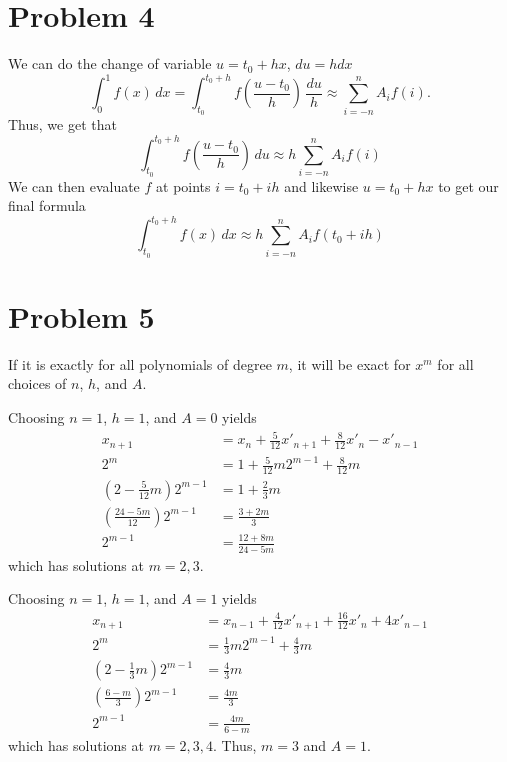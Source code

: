 \documentclass{article}
\begin{document}
\section*{Problem 4}
We can do the change of variable $u = t_0+hx$, $du = h dx$
\[
	\int_0^1 f(x) \,dx =
	\int_{t_0}^{t_0+h} f\left(\frac{u-t_0}{h}\right) \,\frac{du}{h}
	\approx \sum_{i=-n}^n A_i f(i).
\]
Thus, we get that 
\[
	\int_{t_0}^{t_0+h} f\left(\frac{u-t_0}{h}\right) \,du \approx h\sum_{i=-n}^n A_i f(i)
\]
We can then evaluate $f$ at points $i = t_0 + ih$ and likewise $u = t_0 + hx$
to get our final formula 
\[
	\int_{t_0}^{t_0+h} f(x) \,dx \approx h\sum_{i=-n}^n A_i f(t_0 + ih)
\]
\newpage 

\section*{Problem 5}
If it is exactly for all polynomials of degree $m$, it will be exact for $x^m$
for all choices of $n$, $h$, and $A$.

Choosing $n=1$, $h=1$, and $A= 0$ yields
\begin{align*}
	x_{n+1} &= x_n + \frac{5}{12}x'_{n+1} + \frac{8}{12}x'_n -x'_{n-1}\\
	2^m &= 1 + \frac{5}{12}m2^{m-1} + \frac{8}{12}m \\
	\left(2-\frac{5}{12}m\right)2^{m-1} &= 1+\frac{2}{3}m \\
	\left(\frac{24-5m}{12}\right)2^{m-1} &= \frac{3+2m}{3} \\
	2^{m-1} &= \frac{12+8m}{24-5m}
\end{align*}
which has solutions at $m=2,3$.

Choosing $n=1$, $h=1$, and $A= 1$ yields
\begin{align*}
	x_{n+1} &= x_{n-1} + \frac{4}{12}x'_{n+1} + \frac{16}{12}x'_n + 4 x'_{n-1}\\
	2^m &= \frac{1}{3}m2^{m-1} + \frac{4}{3}m \\
	\left(2-\frac{1}{3}m\right)2^{m-1} &= \frac{4}{3}m \\
	\left(\frac{6-m}{3}\right)2^{m-1} &= \frac{4m}{3} \\
	2^{m-1} &= \frac{4m}{6-m}
\end{align*}
which has solutions at $m=2,3,4$. Thus, $m=3$ and $A=1$.
\newpage
\end{document}
